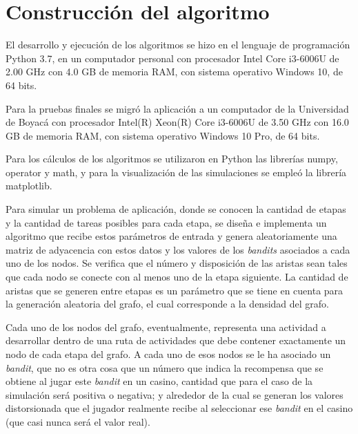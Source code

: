 

\section{Construcción del algoritmo}

El desarrollo y ejecución de los algoritmos se hizo en el lenguaje de programación
Python 3.7, en un computador personal con procesador Intel Core i3-6006U de 2.00 GHz con 4.0 GB de memoria RAM, con sistema operativo Windows 10, de 64 bits.

Para la pruebas finales se migró la aplicación a un computador de la Universidad de Boyacá con procesador Intel(R) Xeon(R) Core i3-6006U de 3.50 GHz con 16.0 GB de memoria RAM, con sistema operativo Windows 10 Pro, de 64 bits.

Para los cálculos de los algoritmos se utilizaron en Python las librerías numpy, operator y math, y para la visualización de las simulaciones se empleó la librería matplotlib.

Para simular un problema de aplicación, donde se conocen la cantidad de etapas y la cantidad de tareas posibles para cada etapa, se diseña e implementa un algoritmo que recibe estos parámetros de entrada y genera aleatoriamente una matriz de adyacencia con estos datos y los valores de los \textit{bandits} asociados a cada uno de los nodos. Se verifica que el número y disposición de las aristas sean tales que cada nodo se conecte con al menos uno de la etapa siguiente. 
La cantidad de aristas que se generen entre etapas es un parámetro que se tiene en cuenta para la generación aleatoria del grafo, el cual corresponde a la densidad del grafo.

Cada uno de los nodos del grafo, eventualmente, representa una actividad a desarrollar dentro de una ruta de actividades que debe contener exactamente un nodo de cada etapa del grafo. A cada uno de esos nodos se le ha asociado un \textit{bandit}, que no es otra cosa que un número que indica la recompensa que se obtiene al jugar este \textit{bandit} en un casino, cantidad que para el caso de la simulación será positiva o negativa; y alrededor de la cual se generan los valores distorsionada que el jugador realmente recibe al seleccionar ese \textit{bandit} en el casino (que casi nunca será el valor real).

